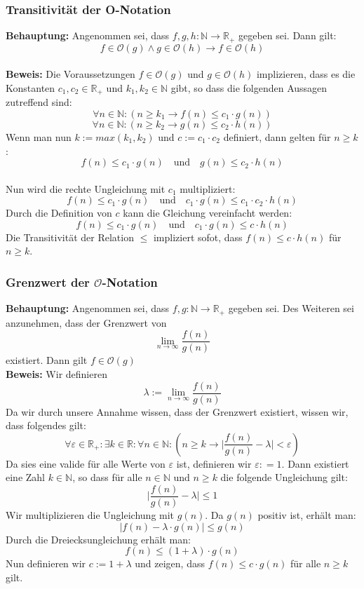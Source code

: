 \documentclass[12px,a4paper]{article}
\begin{document}
\subsubsection{Transitivität der O-Notation}
\textbf{Behauptung:} Angenommen sei, dass $f, g, h: \mathbb{N} \rightarrow \mathbb{R}_+$ gegeben sei. Dann gilt: $$f \in \mathcal{O}(g) \land g \in \mathcal{O}(h) \rightarrow f \in \mathcal{O}(h) $$ \\

\textbf{Beweis:} Die Voraussetzungen $f \in \mathcal{O} (g)$ und $g \in \mathcal{O} (h)$  implizieren, dass es die Konstanten $c_1, c_2 \in \mathbb{R}_+$ und $k_1, k_2\in \mathbb{N}$ gibt, so dass die folgenden Aussagen zutreffend sind: $$\forall n \in \mathbb{N} : (n \geq k_1 \rightarrow f(n) \leq c_1 \cdot g(n))$$ 
	$$\forall n \in \mathbb{N} : (n \geq k_2 \rightarrow g(n) \leq c_2 \cdot h(n))$$ 
	Wenn man nun $k:= max(k_1,k_2)$ und $c:=c_1 \cdot c_2$ definiert, dann gelten für $n \geq k$:
	$$f(n) \leq c_1 \cdot g(n) \quad \textrm{und} \quad g(n) \leq c_2 \cdot h(n)$$ \\
	Nun wird die rechte Ungleichung mit $c_1$ multipliziert:
	$$f(n) \leq c_1 \cdot  g(n) \quad \textrm{und} \quad c_1 \cdot g(n) \leq c_1 \cdot c_2 \cdot h(n)$$
	Durch die Definition von $c$ kann die Gleichung vereinfacht werden: 
	$$f(n) \leq  c_1 \cdot  g(n) \quad \textrm{und} \quad c_1 \cdot g(n) \leq c \cdot h(n)$$
	Die Transitivität der Relation $\leq$ impliziert sofot, dass $f(n) \leq c \cdot h(n)$ für $n \geq k$.


\subsubsection{Grenzwert der $\mathcal{O}$-Notation}
\textbf{Behauptung:} Angenommen sei, dass $f, g: \mathbb{N} \rightarrow \mathbb{R}_+$ gegeben sei. Des Weiteren sei anzunehmen, dass der Grenzwert von $$\lim_{n \rightarrow \infty} \frac{f(n)}{g(n)}$$ existiert. Dann gilt $f \in \mathcal{O}(g)$\\
	\textbf{Beweis:} Wir definieren $$\lambda := \lim_{n \rightarrow \infty} \frac{f(n)}{g(n)} $$
	Da wir durch unsere Annahme wissen, dass der Grenzwert existiert, wissen wir, dass folgendes gilt:
	$$\forall \varepsilon \in \mathbb{R}_+ : \exists k \in \mathbb{R} : \forall n \in \mathbb{N} : (n \geq k \rightarrow \vert \frac{f(n)}{g(n)} - \lambda \vert <  \varepsilon )$$
	Da sies eine valide für alle Werte von $\varepsilon$ ist, definieren wir $\varepsilon : = 1$. Dann existiert eine Zahl $k \in \mathbb{N}$, so dass für alle $n \in \mathbb{N}$ und $n \geq k$ die folgende Ungleichung gilt:
	$$\vert \frac{f(n)}{g(n)} - \lambda \vert \leq 1$$  
	Wir multiplizieren die Ungleichung mit $g(n)$. Da $g(n)$ positiv ist, erhält man:
	$$\vert f(n) - \lambda \cdot g(n) \vert \leq g(n)$$
	Durch die Dreiecksungleichung erhält man:
	$$f(n) \leq (1+ \lambda ) \cdot g(n)$$
	Nun definieren wir $c:= 1 + \lambda$ und zeigen, dass $f(n) \leq c \cdot g(n)$ für alle $n \geq k$ gilt.
\end{document}
